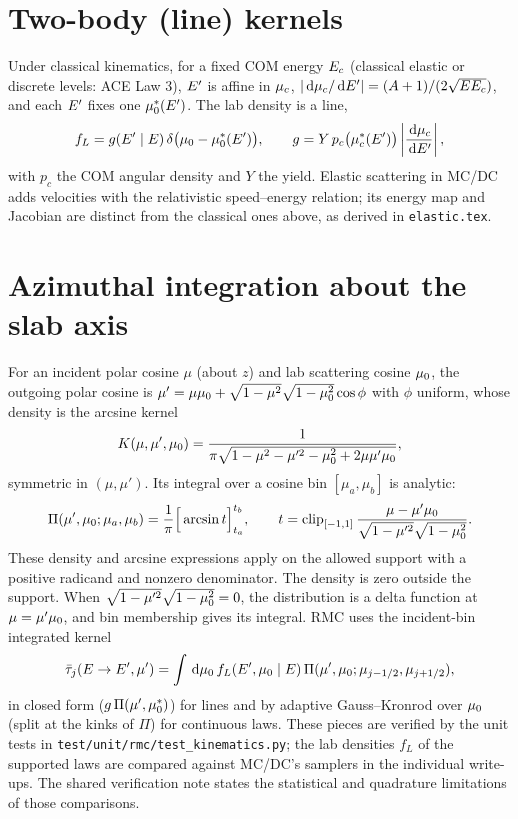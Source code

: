 \documentclass[11pt]{article}
\begin{document}
\section{Two-body (line) kernels}

Under classical kinematics, for a fixed COM energy $E_{c}$
(classical elastic or discrete levels: ACE Law 3),
$E'$ is affine in $\mu_{c}$,
$\left|\,\mathrm{d}\mu_{c}/\,\mathrm{d}E'\right| = (A+1)/(2\sqrt{EE_{c}})$, and each $E'$ fixes one
$\mu_0^*(E')$. The lab density is a line,
\begin{equation}
  f_L = g(E' \mid E)\,\delta\big(\mu_0 - \mu_0^*(E')\big),\qquad
  g = Y\,p_c\big(\mu_{c}^*(E')\big)\left|\frac{\,\mathrm{d}\mu_{c}}{\,\mathrm{d}E'}\right| ,
\end{equation}
with $p_c$ the COM angular density and $Y$ the yield. Elastic scattering in MC/DC adds
velocities with the relativistic speed--energy relation; its energy map and Jacobian
are distinct from the classical ones above, as derived in \texttt{elastic.tex}.

\section{Azimuthal integration about the slab axis}

For an incident polar cosine $\mu$ (about $z$) and lab scattering cosine $\mu_0$, the
outgoing polar cosine is $\mu' = \mu\mu_0 + \sqrt{1-\mu^2}\sqrt{1-\mu_0^2}\cos\phi$
with $\phi$ uniform, whose density is the arcsine kernel
\begin{equation}
  K(\mu, \mu', \mu_0) = \frac{1}{\pi\sqrt{1 - \mu^2 - \mu'^2 - \mu_0^2 + 2\mu\mu'\mu_0}},
\end{equation}
symmetric in $(\mu, \mu')$. Its integral over a cosine bin $[\mu_a, \mu_b]$ is analytic:
\begin{equation}
  \Pi(\mu', \mu_0; \mu_a, \mu_b) = \frac{1}{\pi}\Big[\arcsin t\Big]_{t_a}^{t_b},\qquad
  t = \operatorname{clip}_{[-1,1]}\frac{\mu - \mu'\mu_0}{\sqrt{1-\mu'^2}\sqrt{1-\mu_0^2}}.
\end{equation}
These density and arcsine expressions apply on the allowed support with a positive
radicand and nonzero denominator. The density is zero outside the support.
When $\sqrt{1-\mu'^2}\sqrt{1-\mu_0^2}=0$, the distribution is a delta function
at $\mu=\mu'\mu_0$, and bin membership gives its integral.
RMC uses the incident-bin integrated kernel
\begin{equation}
  \bar\tau_j(E \to E', \mu') = \int\,\mathrm{d}\mu_0\, f_L(E', \mu_0 \mid E)\,
  \Pi(\mu', \mu_0; \mu_{j-1/2}, \mu_{j+1/2}),
\end{equation}
in closed form ($g\,\Pi(\mu', \mu_0^*)$) for lines and by adaptive Gauss--Kronrod over
$\mu_0$ (split at the kinks of $\Pi$) for continuous laws. These pieces are verified
by the unit tests in \texttt{test/unit/rmc/test\_kinematics.py}; the lab densities
$f_L$ of the supported laws are compared against MC/DC's samplers in the individual
write-ups. The shared verification note states the statistical and quadrature
limitations of those comparisons.
\end{document}
